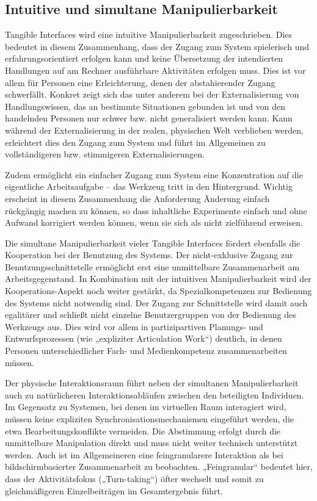 \subsection{Intuitive und simultane Manipulierbarkeit} %
\label{sub:intuitive_und_simultane_manipulierbarkeit}

Tangible Interfaces wird eine intuitive Manipulierbarkeit zugeschrieben. Dies bedeutet in diesem Zusammenhang, dass der Zugang zum System spielerisch und erfahrungsorientiert erfolgen kann und keine Übersetzung der intendierten Handlungen auf am Rechner ausführbare Aktivitäten erfolgen muss. Dies ist vor allem für Personen eine Erleichterung, denen der abstahierender Zugang schwerfällt. Konkret zeigt sich das unter anderem bei der Externalisierung von Handlungswissen, das an bestimmte Situationen gebunden ist und von den handelnden Personen nur schwer bzw. nicht generalisiert werden kann. Kann während der Externalisierung in der realen, physischen Welt verblieben werden, erleichtert dies den Zugang zum System und führt im Allgemeinen zu vollständigeren bzw. stimmigeren Externalisierungen.

Zudem ermöglicht ein einfacher Zugang zum System eine Konzentration auf die eigentliche Arbeitsaufgabe -- das Werkzeug tritt in den Hintergrund. Wichtig erscheint in diesem Zusammenhang die Anforderung Änderung einfach rückgängig machen zu können, so dass inhaltliche Experimente einfach und ohne Aufwand korrigiert werden können, wenn sie sich als nicht zielführend erweisen.

Die simultane Manipulierbarkeit vieler Tangible Interfaces fördert ebenfalls die Kooperation bei der Benutzung des Systems. Der nicht-exklusive Zugang zur Benutzungsschnittstelle ermöglicht erst eine unmittelbare Zusammenarbeit am Arbeitsgegenstand. In Kombination mit der intuitiven Manipulierbarkeit wird der Kooperations-Aspekt noch weiter gestärkt, da Spezialkompetenzen zur Bedienung des Systems nicht notwendig sind. Der Zugang zur Schnittstelle wird damit auch egalitärer und schließt nicht einzelne Benutzergruppen von der Bedienung des Werkzeugs aus. Dies wird vor allem in partizipartiven Planungs- und Entwurfsprozessen (wie „expliziter Articulation Work“) deutlich, in denen Personen unterschiedlicher Fach- und Medienkompetenz zusammenarbeiten müssen. 

Der physische Interaktionsraum führt neben der simultanen Manipulierbarkeit auch zu natürlicheren Interaktionsabläufen zwischen den beteiligten Individuen. Im Gegensatz zu Systemen, bei denen im virtuellen Raum interagiert wird, müssen keine expliziten Synchronisationsmechanismen eingeführt werden, die etwa Bearbeitungskonflikte vermeiden. Die Abstimmung erfolgt durch die unmittelbare Manipulation direkt und muss nicht weiter technisch unterstützt werden. Auch ist im Allgemeineren eine feingranularere Interaktion als bei bildschirmbasierter Zusammenarbeit zu beobachten. „Feingranular“ bedeutet hier, dass der Aktivitätsfokus („Turn-taking“) öfter wechselt und somit zu gleichmäßigeren Einzelbeiträgen im Gesamtergebnis führt.

